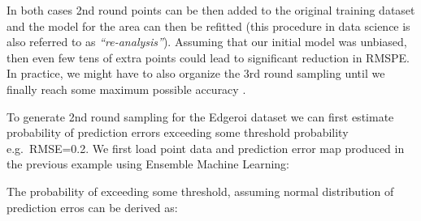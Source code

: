 \documentclass[
  graybox,natbib,nospthms]{svmono}
\newenvironment{Shaded}{\begin{snugshade}}{\end{snugshade}}
\newcommand{\CommentTok}[1]{\textcolor[rgb]{0.37,0.37,0.37}{\textit{#1}}}
\newcommand{\DecValTok}[1]{\textcolor[rgb]{0.06,0.06,0.06}{#1}}
\newcommand{\ErrorTok}[1]{\textcolor[rgb]{0.14,0.14,0.14}{\textbf{#1}}}
\newcommand{\FloatTok}[1]{\textcolor[rgb]{0.06,0.06,0.06}{#1}}
\newcommand{\FunctionTok}[1]{\textcolor[rgb]{0,0,0}{#1}}
\newcommand{\NormalTok}[1]{#1}
\newcommand{\OtherTok}[1]{\textcolor[rgb]{0.37,0.37,0.37}{#1}}
\newcommand{\SpecialCharTok}[1]{\textcolor[rgb]{0,0,0}{#1}}
\newcommand{\StringTok}[1]{\textcolor[rgb]{0.5,0.5,0.5}{#1}}
\begin{document}
In both cases 2nd round points can be then added to the original training dataset and the
model for the area can then be refitted (this procedure in data science is also referred to as \emph{``re-analysis''}).
Assuming that our initial model was unbiased, then even few tens of extra points
could lead to significant reduction in RMSPE. In practice, we might have to also
organize the 3rd round sampling until we finally reach some maximum possible accuracy \citep{hengl2018random}.

To generate 2nd round sampling for the Edgeroi dataset we can first estimate probability
of prediction errors exceeding some threshold probability e.g.~RMSE=0.2. We first
load point data and prediction error map produced in the previous example using
Ensemble Machine Learning:

\begin{Shaded}
\end{Shaded}

The probability of exceeding some threshold, assuming normal distribution of prediction
erros can be derived as:

\begin{Shaded}
\end{Shaded}
\end{document}
